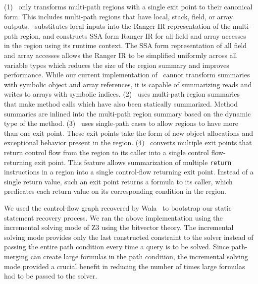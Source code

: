 (1) \tool\ only transforms multi-path regions with a single exit point to their canonical form.
This includes multi-path regions that have local, stack, field, or array outputs.
%
\tool\ substitutes local inputs into the Ranger IR representation of the multi-path region, and constructs SSA form
Ranger IR for all field and array accesses in the region using its runtime context.
%
The SSA form representation of all field and array accesses allows the Ranger IR to be simplified uniformly across all
variable types which reduces the size of the region summary and improves performance.
%
While our current implementation of \tool\ cannot transform summaries with symbolic object and array
references, it is capable of summarizing reads and writes to arrays with symbolic indices.
%
(2) \tool\ uses multi-path region
summaries that make method calls which have also been statically summarized.
%
Method summaries are inlined into
the multi-path region summary based on the dynamic type of the method.
%
(3) \tool\ uses single-path cases to allow regions to have more than one exit point.
%
These exit points take the form of new object allocations and exceptional behavior present in the region.
%
(4) \tool\ converts multiple exit points that return
control flow from the region to its caller into a single control flow-returning exit point.
%
This feature allows summarization of multiple {\tt return} instructions in a region into a single control-flow
returning exit point.
%
Instead of a single return value, such an exit point returns a formula to its caller, which predicates
each return value on its corresponding condition in the region.

We used the control-flow graph recovered by Wala~\cite{Wala} to bootstrap our static statement recovery process.
%
%
%
We ran the above implementation using the incremental solving mode of Z3 using the bitvector theory.
%
The incremental solving mode provides only the last constructed constraint to the solver instead of passing the entire
path condition every time a query is to be solved.
%
Since path-merging can create large formulas in the path condition, the incremental solving mode provided a crucial
benefit in reducing the number of times large formulas had to be passed to the solver.
%
